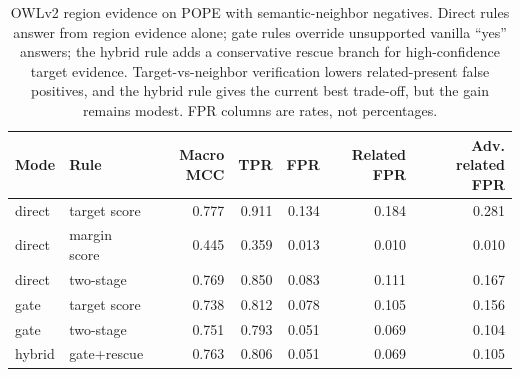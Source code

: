 \begin{table}[t]
\centering
\small
\setlength{\tabcolsep}{4.0pt}
\begin{tabular}{llrrrrr}
\toprule
Mode & Rule & Macro MCC & TPR & FPR & Related FPR & Adv. related FPR \\
\midrule
direct & target score & 0.777 & 0.911 & 0.134 & 0.184 & 0.281 \\
direct & margin score & 0.445 & 0.359 & 0.013 & 0.010 & 0.010 \\
direct & two-stage & 0.769 & 0.850 & 0.083 & 0.111 & 0.167 \\
\midrule
gate & target score & 0.738 & 0.812 & 0.078 & 0.105 & 0.156 \\
gate & two-stage & 0.751 & 0.793 & 0.051 & 0.069 & 0.104 \\
hybrid & gate+rescue & 0.763 & 0.806 & 0.051 & 0.069 & 0.105 \\
\bottomrule
\end{tabular}
\caption{OWLv2 region evidence on POPE with semantic-neighbor negatives. Direct rules answer from region evidence alone; gate rules override unsupported vanilla ``yes'' answers; the hybrid rule adds a conservative rescue branch for high-confidence target evidence. Target-vs-neighbor verification lowers related-present false positives, and the hybrid rule gives the current best trade-off, but the gain remains modest. FPR columns are rates, not percentages.}
\label{tab:region-verifier-pope}
\end{table}
